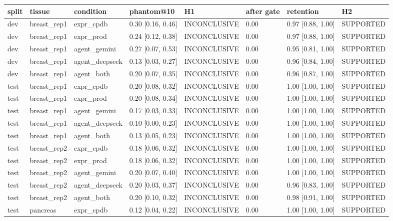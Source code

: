 \begin{table}[t]\centering\small
\begin{tabular}{llllllll}\toprule
split & tissue & condition & phantom@10 & H1 & after gate & retention & H2\\\midrule
dev & breast\_rep1 & expr\_cpdb & 0.30 [0.16, 0.46] & INCONCLUSIVE & 0.00 & 0.97 [0.88, 1.00] & SUPPORTED\\
dev & breast\_rep1 & expr\_prod & 0.24 [0.12, 0.38] & INCONCLUSIVE & 0.00 & 0.97 [0.88, 1.00] & SUPPORTED\\
dev & breast\_rep1 & agent\_gemini & 0.27 [0.07, 0.53] & INCONCLUSIVE & 0.00 & 0.95 [0.81, 1.00] & SUPPORTED\\
dev & breast\_rep1 & agent\_deepseek & 0.13 [0.03, 0.27] & INCONCLUSIVE & 0.00 & 0.96 [0.84, 1.00] & SUPPORTED\\
dev & breast\_rep1 & agent\_both & 0.20 [0.07, 0.35] & INCONCLUSIVE & 0.00 & 0.96 [0.87, 1.00] & SUPPORTED\\
test & breast\_rep1 & expr\_cpdb & 0.20 [0.08, 0.32] & INCONCLUSIVE & 0.00 & 1.00 [1.00, 1.00] & SUPPORTED\\
test & breast\_rep1 & expr\_prod & 0.20 [0.08, 0.34] & INCONCLUSIVE & 0.00 & 1.00 [1.00, 1.00] & SUPPORTED\\
test & breast\_rep1 & agent\_gemini & 0.17 [0.03, 0.33] & INCONCLUSIVE & 0.00 & 1.00 [1.00, 1.00] & SUPPORTED\\
test & breast\_rep1 & agent\_deepseek & 0.10 [0.00, 0.23] & INCONCLUSIVE & 0.00 & 1.00 [1.00, 1.00] & SUPPORTED\\
test & breast\_rep1 & agent\_both & 0.13 [0.05, 0.23] & INCONCLUSIVE & 0.00 & 1.00 [1.00, 1.00] & SUPPORTED\\
test & breast\_rep2 & expr\_cpdb & 0.18 [0.06, 0.32] & INCONCLUSIVE & 0.00 & 1.00 [1.00, 1.00] & SUPPORTED\\
test & breast\_rep2 & expr\_prod & 0.18 [0.06, 0.32] & INCONCLUSIVE & 0.00 & 1.00 [1.00, 1.00] & SUPPORTED\\
test & breast\_rep2 & agent\_gemini & 0.20 [0.07, 0.40] & INCONCLUSIVE & 0.00 & 1.00 [1.00, 1.00] & SUPPORTED\\
test & breast\_rep2 & agent\_deepseek & 0.20 [0.03, 0.37] & INCONCLUSIVE & 0.00 & 0.96 [0.83, 1.00] & SUPPORTED\\
test & breast\_rep2 & agent\_both & 0.20 [0.10, 0.32] & INCONCLUSIVE & 0.00 & 0.98 [0.91, 1.00] & SUPPORTED\\
test & pancreas & expr\_cpdb & 0.12 [0.04, 0.22] & INCONCLUSIVE & 0.00 & 1.00 [1.00, 1.00] & SUPPORTED\\

\end{tabular}
\end{table}
